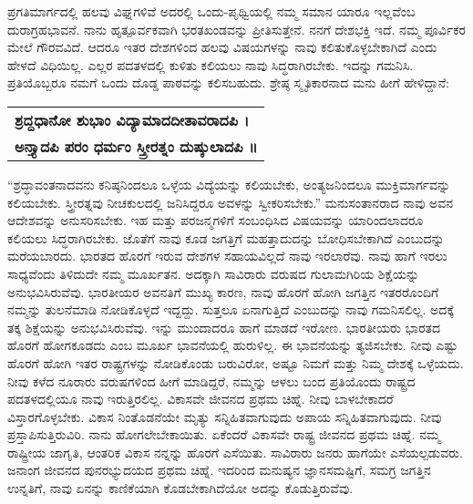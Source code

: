 ಪ್ರಗತಿಮಾರ್ಗದಲ್ಲಿ ಹಲವು ವಿಘ್ನಗಳಿವೆ ಅದರಲ್ಲಿ ಒಂದು-ಪೃಥ್ವಿಯಲ್ಲಿ ನಮ್ಮ ಸಮಾನ ಯಾರೂ ಇಲ್ಲವೆಂಬ ದುರಾಗ್ರಹಭಾವನೆ. ನಾನು ಹೃತ್ಪೂರ್ವಕವಾಗಿ ಭರತಖಂಡವನ್ನು ಪ್ರೀತಿಸುತ್ತೇನೆ. ನನಗೆ ದೇಶಭಕ್ತಿ ಇದೆ. ನಮ್ಮ ಪೂರ್ವಿಕರ ಮೇಲೆ ಗೌರವವಿದೆ. ಆದರೂ ಇತರ ದೇಶಗಳಿಂದ ಹಲವು ವಿಷಯಗಳನ್ನು ನಾವು ಕಲಿತುಕೊಳ್ಳಬೇಕಾಗಿದೆ ಎಂದು ಹೇಳದೆ ವಿಧಿಯಿಲ್ಲ. ಎಲ್ಲರ ಪದತಳದಲ್ಲಿ ಕುಳಿತು ಕಲಿಯಲು ನಾವು ಸಿದ್ಧರಾಗಿರಬೇಕು. ಇದನ್ನು ಗಮನಿಸಿ. ಪ್ರತಿಯೊಬ್ಬರೂ ನಮಗೆ ಒಂದು ದೊಡ್ಡ ಪಾಠವನ್ನು ಕಲಿಸಬಹುದು. ಶ್ರೇಷ್ಠ ಸ್ಮೃತಿಕಾರನಾದ ಮನು ಹೀಗೆ ಹೇಳಿದ್ದಾನೆ:

\begin{longtable}{@{}l@{}}
\textbf{ಶ್ರದ್ದಧಾನೋ ಶುಭಾಂ ವಿದ್ಯಾಮಾದದೀತಾವರಾದಪಿ ।} \\
\textbf{ಅನ್ತ್ಯಾದಪಿ ಪರಂ ಧರ್ಮಂ ಸ್ತ್ರೀರತ್ನಂ ದುಷ್ಕುಲಾದಪಿ ॥} \\
\end{longtable}

“ಶ್ರದ್ಧಾವಂತನಾದವನು ಕನಿಷ್ಠನಿಂದಲೂ ಒಳ್ಳೆಯ ವಿದ್ಯೆಯನ್ನು ಕಲಿಯಬೇಕು, ಅಂತ್ಯಜನಿಂದಲೂ ಮುಕ್ತಿಮಾರ್ಗವನ್ನು ಕಲಿಯಬೇಕು. ಸ್ತ್ರೀರತ್ನವು ನೀಚಕುಲದಲ್ಲಿ ಜನಿಸಿದ್ದರೂ ಅವಳನ್ನು ಸ್ವೀಕರಿಸಬೇಕು.” ಮನುಸಂತಾನರಾದ ನಾವು ಅವನ ಆದೇಶವನ್ನು ಅನುಸರಿಸಬೇಕು. ಇಹ ಮತ್ತು ಪರಜನ್ಮಗಳಿಗೆ ಸಂಬಂಧಿಸಿದ ವಿಷಯವನ್ನು ಯಾರಿಂದಲಾದರೂ ಕಲಿಯಲು ಸಿದ್ಧರಾಗಿರಬೇಕು. ಜೊತೆಗೆ ನಾವು ಕೂಡ ಜಗತ್ತಿಗೆ ಮಹತ್ತಾದುದನ್ನು ಬೋಧಿಸಬೇಕಾಗಿದೆ ಎಂಬುದನ್ನು ಮರೆಯಬಾರದು. ಭಾರತದ ಹೊರಗೆ ಇರುವ ದೇಶಗಳ ಸಹಾಯವಿಲ್ಲದೆ ನಾವು ಇರಲಾರೆವು. ನಾವು ಹಾಗೆ ಇರಲು ಸಾಧ್ಯವೆಂದು ತಿಳಿದುದೇ ನಮ್ಮ ಮೂರ್ಖತನ. ಅದಕ್ಕಾಗಿ ಸಾವಿರಾರು ವರುಷದ ಗುಲಾಮಗಿರಿಯ ಶಿಕ್ಷೆಯನ್ನು ಅನುಭವಿಸಿರುವೆವು. ಭಾರತೀಯರ ಅವನತಿಗೆ ಮುಖ್ಯ ಕಾರಣ, ನಾವು ಹೊರಗೆ ಹೋಗಿ ಜಗತ್ತಿನ ಇತರರೊಂದಿಗೆ ನಮ್ಮನ್ನು ತುಲನೆಮಾಡಿ ನೋಡಿಕೊಳ್ಳದೆ ಇದ್ದದ್ದು. ಸುತ್ತಲೂ ಏನಾಗುತ್ತಿದೆ ಎಂಬುದನ್ನು ನಾವು ಗಮನಿಸಲಿಲ್ಲ. ಅದಕ್ಕೆ ತಕ್ಕ ಶಿಕ್ಷೆಯನ್ನು ಅನುಭವಿಸಿರುವೆವು. ಇನ್ನು ಮುಂದಾದರೂ ಹಾಗೆ ಮಾಡದೆ ಇರೋಣ. ಭಾರತೀಯರು ಭಾರತದ ಹೊರಗೆ ಹೋಗಕೂಡದು ಎಂಬ ಮೂರ್ಖ ಭಾವನೆಯಲ್ಲಿ ಹುರುಳಿಲ್ಲ. ಈ ಭಾವನೆಯನ್ನು ತ್ಯಜಿಸಬೇಕು. ನೀವು ಎಷ್ಟು ಹೊರಗೆ ಹೋಗಿ ಇತರ ರಾಷ್ಟ್ರಗಳನ್ನು ನೋಡಿಕೊಂಡು ಬರುವಿರೋ, ಅಷ್ಟೂ ನಿಮಗೆ ಮತ್ತು ನಿಮ್ಮ ದೇಶಕ್ಕೆ ಒಳ್ಳೆಯದು. ನೀವು ಕಳೆದ ನೂರಾರು ವರುಷಗಳಿಂದ ಹೀಗೆ ಮಾಡಿದ್ದರೆ, ನಮ್ಮನ್ನು ಆಳಲು ಬಂದ ಪ್ರತಿಯೊಂದು ರಾಷ್ಟ್ರದ ಪದತಳದಲ್ಲಿಯೂ ನಾವು ಇರುತ್ತಿರಲಿಲ್ಲ. ವಿಕಾಸವೇ ಜೀವನದ ಪ್ರಥಮ ಚಿಹ್ನೆ. ನೀವು ಬಾಳಬೇಕಾದರೆ ವಿಸ್ತಾರಗೊಳ್ಳಬೇಕು. ವಿಕಾಸ ನಿಂತೊಡನೆಯೇ ಮೃತ್ಯು ಸನ್ನಿಹಿತವಾಗುವುದು ಅಪಾಯ ಸನ್ನಿಹಿತವಾಗುವುದು. ನೀವು ಪ್ರಸ್ತಾಪಿಸುತ್ತಿರುವಿರಿ. ನಾನು ಹೋಗಲೇಬೇಕಾಯಿತು. ಏಕೆಂದರೆ ವಿಕಾಸವೇ ರಾಷ್ಟ್ರ ಜೀವನದ ಪ್ರಥಮ ಚಿಹ್ನೆ. ನಮ್ಮ ರಾಷ್ಟ್ರೀಯ ಜಾಗೃತಿ, ಆಂತರಿಕ ವಿಕಾಸ ನನ್ನನ್ನು ಹೊರಗೆ ಎಸೆಯಿತು. ಸಾವಿರಾರು ಜನರು ಹಾಗೆಯೇ ಎಸೆಯಲ್ಪಡುವರು. ಜನಾಂಗ ಜೀವನದ ಪುನರಭ್ಯುದಯದ ಪ್ರಥಮ ಚಿಹ್ನೆ. ಇದರಿಂದ ಮನುಷ್ಯನ ಜ್ಞಾನಸಮಷ್ಟಿಗೆ, ಸಮಗ್ರ ಜಗತ್ತಿನ ಉನ್ನತಿಗೆ, ನಾವು ಏನನ್ನು ಕಾಣಿಕೆಯಾಗಿ ಕೊಡಬೇಕಾಗಿದೆಯೋ ಅದನ್ನು ಕೊಡುತ್ತಿರುವೆವು.

